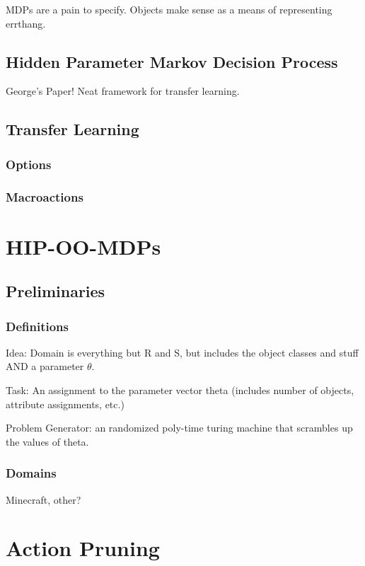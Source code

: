 \documentclass[11pt]{article}
\begin{document}
MDPs are a pain to specify. Objects make sense as a means of representing errthang.

\subsection{Hidden Parameter Markov Decision Process}

George's Paper! Neat framework for transfer learning.


\subsection{Transfer Learning}

\subsubsection{Options}
\subsubsection{Macroactions}


\section{HIP-OO-MDPs}

\subsection{Preliminaries}

\subsubsection{Definitions}
Idea: Domain is everything but R and S, but includes the object classes and stuff AND a parameter $\theta$.

Task: An assignment to the parameter vector theta (includes number of objects, attribute assignments, etc.)

Problem Generator: an randomized poly-time turing machine that scrambles up the values of theta.

\subsubsection{Domains}

Minecraft, other?


\section{Action Pruning}
\end{document}
